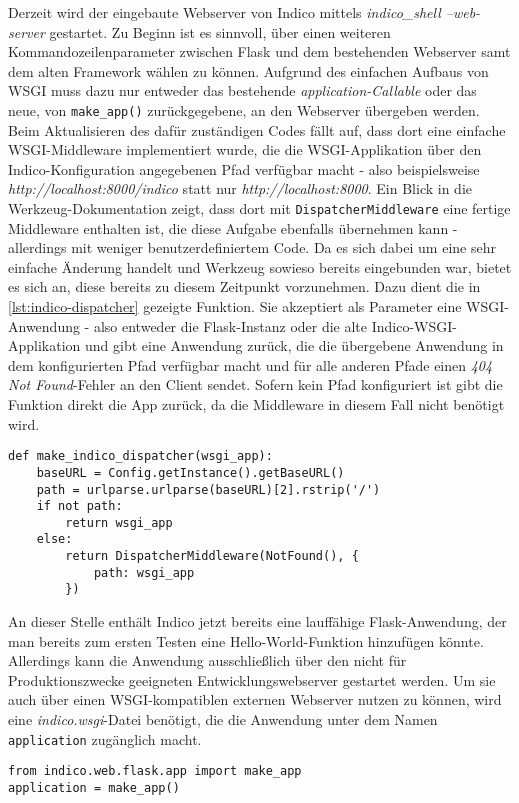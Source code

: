 Derzeit wird der eingebaute Webserver von Indico mittels \emph{indico\_shell --web-server}
gestartet. Zu Beginn ist es sinnvoll, über einen weiteren Kommandozeilenparameter zwischen Flask und
dem bestehenden Webserver samt dem alten Framework wählen zu können. Aufgrund des einfachen Aufbaus
von WSGI muss dazu nur entweder das bestehende \emph{application-Callable} oder das neue, von
\lstinline{make_app()} zurückgegebene, an den Webserver übergeben werden. Beim Aktualisieren des
dafür zuständigen Codes fällt auf, dass dort eine einfache WSGI-Middleware implementiert wurde, die
die WSGI-Applikation über den Indico-Konfiguration angegebenen Pfad verfügbar macht - also
beispielsweise \emph{http://localhost:8000/indico} statt nur \emph{http://localhost:8000}. Ein Blick
in die Werkzeug-Dokumentation zeigt, dass dort mit \lstinline{DispatcherMiddleware} eine fertige
Middleware enthalten ist, die diese Aufgabe ebenfalls übernehmen kann - allerdings mit weniger
benutzerdefiniertem Code. Da es sich dabei um eine sehr einfache Änderung handelt und Werkzeug
sowieso bereits eingebunden war, bietet es sich an, diese bereits zu diesem Zeitpunkt vorzunehmen.
Dazu dient die in \autoref{lst:indico-dispatcher} gezeigte Funktion. Sie akzeptiert als Parameter
eine WSGI-Anwendung - also entweder die Flask-Instanz oder die alte Indico-WSGI-Applikation und gibt
eine Anwendung zurück, die die übergebene Anwendung in dem konfigurierten Pfad verfügbar macht und
für alle anderen Pfade einen \emph{404 Not Found}-Fehler an den Client sendet. Sofern kein Pfad
konfiguriert ist gibt die Funktion direkt die App zurück, da die Middleware in diesem Fall nicht
benötigt wird.

\begin{lstlisting}[caption=Indico-WSGI-Dispatcher,label=lst:indico-dispatcher]
def make_indico_dispatcher(wsgi_app):
    baseURL = Config.getInstance().getBaseURL()
    path = urlparse.urlparse(baseURL)[2].rstrip('/')
    if not path:
        return wsgi_app
    else:
        return DispatcherMiddleware(NotFound(), {
            path: wsgi_app
        })
\end{lstlisting}

An dieser Stelle enthält Indico jetzt bereits eine lauffähige Flask-Anwendung, der man bereits zum
ersten Testen eine Hello-World-Funktion hinzufügen könnte. Allerdings kann die Anwendung
ausschließlich über den nicht für Produktionszwecke geeigneten Entwicklungswebserver gestartet
werden. Um sie auch über einen WSGI-kompatiblen externen Webserver nutzen zu können, wird eine
\emph{indico.wsgi}-Datei benötigt, die die Anwendung unter dem Namen \lstinline{application}
zugänglich macht.

\begin{lstlisting}[caption=indico.wsgi]
from indico.web.flask.app import make_app
application = make_app()
\end{lstlisting}
